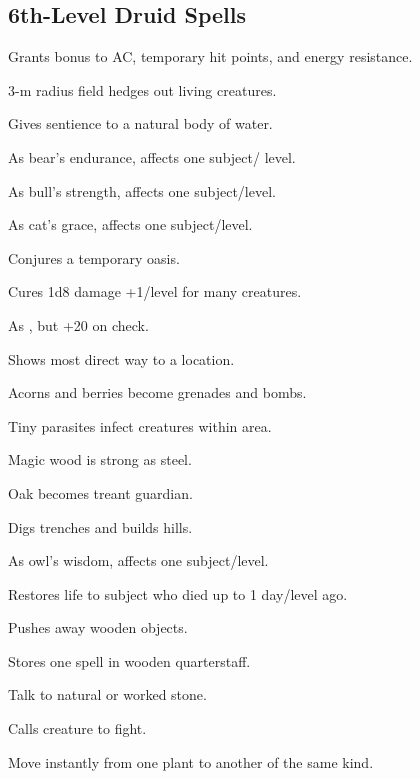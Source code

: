 \subsection{6th-Level Druid Spells}

 Grants bonus to AC, temporary hit points, and energy resistance.

 3-m radius field hedges out living creatures.

 Gives sentience to a natural body of water.

 As bear's endurance, affects one subject/ level.

 As bull's strength, affects one subject/level.

 As cat's grace, affects one subject/level.

 Conjures a temporary oasis.

 Cures 1d8 damage +1/level for many creatures.

 As , but +20 on check.

 Shows most direct way to a location.

 Acorns and berries become grenades and bombs.

 Tiny parasites infect creatures within area.

 Magic wood is strong as steel.

 Oak becomes treant guardian.

 Digs trenches and builds hills.

 As owl's wisdom, affects one subject/level.

 Restores life to subject who died up to 1 day/level ago.

 Pushes away wooden objects.

 Stores one spell in wooden quarterstaff.

 Talk to natural or worked stone.

 Calls creature to fight.

 Move instantly from one plant to another of the same kind.

